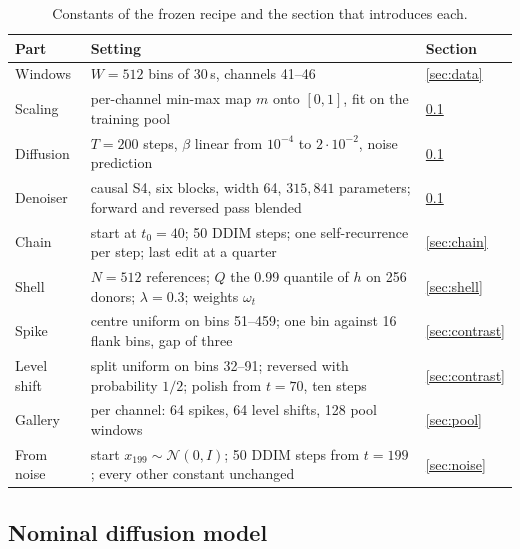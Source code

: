 \documentclass[11pt,a4paper]{article}
\begin{document}
\begin{table}[t]
\centering
\caption{Constants of the frozen recipe and the section that introduces
each.}
\label{tab:recipe}
\small
\begin{tabular}{@{}lp{10.6cm}l@{}}
\toprule
Part & Setting & Section \\
\midrule
Windows & $W = 512$ bins of 30\,s, channels 41--46 & \ref{sec:data} \\
Scaling & per-channel min-max map $m$ onto $[0, 1]$, fit on the training pool
  & \ref{sec:denoiser} \\
Diffusion & $T = 200$ steps, $\beta$ linear from $10^{-4}$ to $2 \cdot 10^{-2}$,
  noise prediction & \ref{sec:denoiser} \\
Denoiser & causal S4, six blocks, width 64, $315{,}841$ parameters; forward
  and reversed pass blended & \ref{sec:denoiser} \\
Chain & start at $t_{0} = 40$; 50 DDIM steps; one self-recurrence per step;
  last edit at a quarter & \ref{sec:chain} \\
Shell & $N = 512$ references; $Q$ the 0.99 quantile of $h$ on 256 donors;
  $\lambda = 0.3$; weights $\omega_{t}$ & \ref{sec:shell} \\
Spike & centre uniform on bins 51--459; one bin against 16 flank bins, gap of
  three & \ref{sec:contrast} \\
Level shift & split uniform on bins 32--91; reversed with probability $1/2$;
  polish from $t = 70$, ten steps & \ref{sec:contrast} \\
Gallery & per channel: 64 spikes, 64 level shifts, 128 pool windows
  & \ref{sec:pool} \\
From noise & start $x_{199} \sim \mathcal{N}(0, I)$; 50 DDIM steps from
  $t = 199$; every other constant unchanged & \ref{sec:noise} \\
\bottomrule
\end{tabular}
\end{table}

\subsection{Nominal diffusion model}
\label{sec:denoiser}
\end{document}
